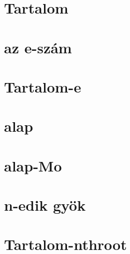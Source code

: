 








\begin{spacing}{1.2}




   \section*{Tartalom} \label{Tart}
         \newline
         \newline
      \newpage
      \section*{az e-szám} \label{e}
      \section*{Tartalom-e} \label{Tarte}
         \newline
         \newpage
         \section*{alap} \label{e1}
         \Fa{
            
         }
         \newpage
         \section*{alap-Mo} \label{e1Mo}
         \Mo{
            
         }
         \newpage
      \section*{n-edik gyök} \label{nthroot}
      \section*{Tartalom-nthroot} \label{Tartnthroot}
         \newline
         \newline
         \newline
         \newline
         \newline
         \newpage

\end{spacing}
